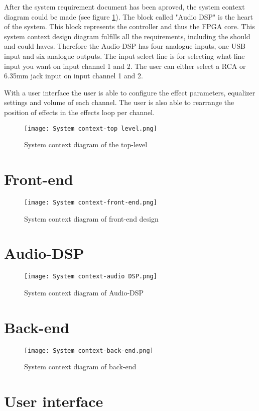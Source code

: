 After the system requirement document has been aproved, the system context diagram could be made (see figure \ref*{fig:sys-context-top}).
The block called "Audio DSP" is the heart of the system.
This block represents the controller and thus the FPGA core.
This system context design diagram fulfills all the requirements, including the should and could haves.
Therefore the Audio-DSP has four analogue inputs, one USB input and six analogue outputs.
The input select line is for selecting what line input you want on input channel 1 and 2.
The user can either select a RCA or 6.35mm jack input on input channel 1 and 2.

With a user interface the user is able to configure the effect parameters, equalizer settings and volume of each channel.
The user is also able to rearrange the position of effects in the effects loop per channel.

\begin{figure}[h]
    \texttt{[image: System context-top level.png]}
    \caption{System context diagram of the top-level}
    \label{fig:sys-context-top}
\end{figure}

\section{Front-end}


\begin{figure}[h]
    \texttt{[image: System context-front-end.png]}
    \caption{System context diagram of front-end design}
\end{figure}

\section{Audio-DSP}
\begin{figure}[h]
    \texttt{[image: System context-audio DSP.png]}
    \caption{System context diagram of Audio-DSP}
\end{figure}

\section{Back-end}
\begin{figure}[h]
    \texttt{[image: System context-back-end.png]}
    \caption{System context diagram of back-end}
\end{figure}

\section{User interface}

